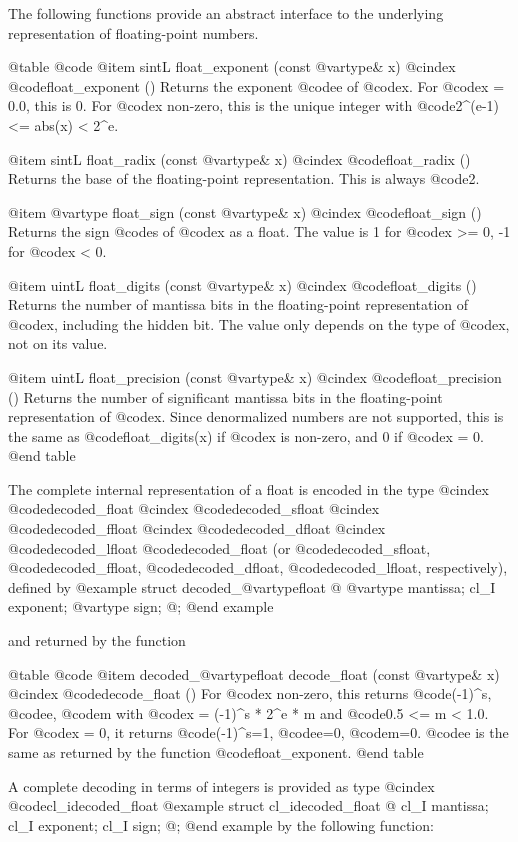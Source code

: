 The following functions provide an abstract interface to the underlying
representation of floating-point numbers.

@table @code
@item sintL float_exponent (const @var{type}& x)
@cindex @code{float_exponent ()}
Returns the exponent @code{e} of @code{x}.
For @code{x = 0.0}, this is 0. For @code{x} non-zero, this is the unique
integer with @code{2^(e-1) <= abs(x) < 2^e}.

@item sintL float_radix (const @var{type}& x)
@cindex @code{float_radix ()}
Returns the base of the floating-point representation. This is always @code{2}.

@item @var{type} float_sign (const @var{type}& x)
@cindex @code{float_sign ()}
Returns the sign @code{s} of @code{x} as a float. The value is 1 for
@code{x} >= 0, -1 for @code{x} < 0.

@item uintL float_digits (const @var{type}& x)
@cindex @code{float_digits ()}
Returns the number of mantissa bits in the floating-point representation
of @code{x}, including the hidden bit. The value only depends on the type
of @code{x}, not on its value.

@item uintL float_precision (const @var{type}& x)
@cindex @code{float_precision ()}
Returns the number of significant mantissa bits in the floating-point
representation of @code{x}. Since denormalized numbers are not supported,
this is the same as @code{float_digits(x)} if @code{x} is non-zero, and
0 if @code{x} = 0.
@end table

The complete internal representation of a float is encoded in the type
@cindex @code{decoded_float}
@cindex @code{decoded_sfloat}
@cindex @code{decoded_ffloat}
@cindex @code{decoded_dfloat}
@cindex @code{decoded_lfloat}
@code{decoded_float} (or @code{decoded_sfloat}, @code{decoded_ffloat},
@code{decoded_dfloat}, @code{decoded_lfloat}, respectively), defined by
@example
struct decoded_@var{type}float @{
        @var{type} mantissa; cl_I exponent; @var{type} sign;
@};
@end example

and returned by the function

@table @code
@item decoded_@var{type}float decode_float (const @var{type}& x)
@cindex @code{decode_float ()}
For @code{x} non-zero, this returns @code{(-1)^s}, @code{e}, @code{m} with
@code{x = (-1)^s * 2^e * m} and @code{0.5 <= m < 1.0}. For @code{x} = 0,
it returns @code{(-1)^s}=1, @code{e}=0, @code{m}=0.
@code{e} is the same as returned by the function @code{float_exponent}.
@end table

A complete decoding in terms of integers is provided as type
@cindex @code{cl_idecoded_float}
@example
struct cl_idecoded_float @{
        cl_I mantissa; cl_I exponent; cl_I sign;
@};
@end example
by the following function:


